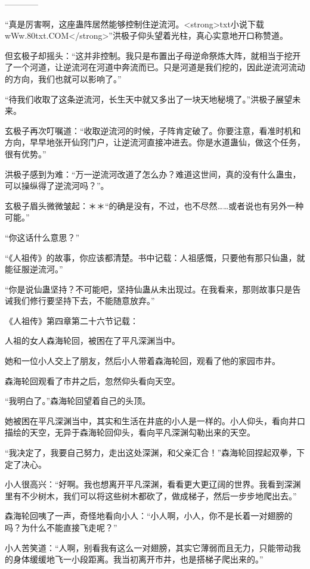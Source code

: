 
\begin{this_body}

------------

“真是厉害啊，这座蛊阵居然能够控制住逆流河。<strong>txt小说下载wWw.80txt.COM</strong>”洪极子仰头望着光柱，真心实意地开口称赞道。

但玄极子却摇头：“这并非控制。我只是布置出子母逆命祭炼大阵，就相当于挖开了一个河道，让逆流河在河道中奔流而已。只是河道是我们挖的，因此逆流河流动的方向，我们也就可以影响了。”

“待我们收取了这条逆流河，长生天中就又多出了一块天地秘境了。”洪极子展望未来。

玄极子再次叮嘱道：“收取逆流河的时候，子阵肯定破了。你要注意，看准时机和方向，早早地张开仙窍门户，让逆流河直接冲进去。你是水道蛊仙，做这个任务，很有优势。”

洪极子感到为难：“万一逆流河改道了怎么办？难道这世间，真的没有什么蛊虫，可以操纵得了逆流河吗？”。

玄极子眉头微微皱起：＊＊“的确是没有，不过，也不尽然……或者说也有另外一种可能。”

“你这话什么意思？”

“《人祖传》的故事，你应该都清楚。书中记载：人祖感慨，只要他有那只仙蛊，就能征服逆流河。”

“你是说仙蛊坚持？不可能吧，坚持仙蛊从未出现过。在我看来，那则故事只是告诫我们修行要坚持下去，不能随意放弃。”

《人祖传》第四章第二十六节记载：

人祖的女人森海轮回，被困在了平凡深渊当中。

她和一位小人交上了朋友，然后小人带着森海轮回，观看了他的家园市井。

森海轮回观看了市井之后，忽然仰头看向天空。

“我明白了。”森海轮回望着自己的头顶。

她被困在平凡深渊当中，其实和生活在井底的小人是一样的。小人仰头，看向井口描绘的天空，无异于森海轮回仰头，看向平凡深渊勾勒出来的天空。

“我决定了，我要自己努力，走出这处深渊，和父亲汇合！”森海轮回捏起双拳，下定了决心。

小人很高兴：“好啊。我也想离开平凡深渊，看看更大更辽阔的世界。我看到深渊里有不少树木，我们可以将这些树木都砍了，做成梯子，然后一步步地爬出去。”

森海轮回咦了一声，奇怪地看向小人：“小人啊，小人，你不是长着一对翅膀的吗？为什么不能直接飞走呢？”

小人苦笑道：“人啊，别看我有这么一对翅膀，其实它薄弱而且无力，只能带动我的身体缓缓地飞一小段距离。我当初离开市井，也是搭梯子爬出来的。”


\end{this_body}
